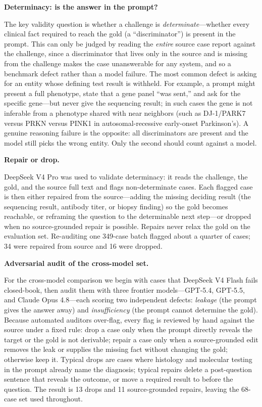 \documentclass{article}
\renewcommand{\paragraph}[1]{%
  \par\addvspace{0.42\baselineskip}%
  \noindent\textbf{#1}\par\nobreak\vspace{-0.28\baselineskip}%
}
\begin{document}
\paragraph{Determinacy: is the answer in the prompt?} The key validity question is whether a challenge is
\emph{determinate}---whether every clinical fact required to reach the gold (a ``discriminator'') is present
in the prompt. This can only be judged by reading the \emph{entire} source case report against the
challenge, since a discriminator that lives only in the source and is missing from the challenge makes the
case unanswerable for any system, and so a benchmark defect rather than a model failure. The most common
defect is asking for an entity whose defining test result is withheld. For example, a prompt might present a
full phenotype, state that a gene panel ``was sent,'' and ask for the specific gene---but never give the
sequencing result; in such cases the gene is not inferable from a phenotype shared with near neighbors (such
as DJ-1/PARK7 versus PRKN versus PINK1 in autosomal-recessive early-onset Parkinson's). A genuine reasoning
failure is the opposite: all discriminators are present and the model still picks the wrong entity. Only the
second should count against a model.

\paragraph{Repair or drop.} DeepSeek V4 Pro was used to validate determinacy: it reads the challenge, the
gold, and the source full text and flags non-determinate cases. Each flagged case is then either repaired
from the source---adding the missing deciding result (the sequencing result, antibody titer, or biopsy
finding) so the gold becomes
reachable, or reframing the question to the determinable next step---or dropped when no source-grounded
repair is possible. Repairs never relax the gold on the evaluation set. Re-auditing one 349-case batch
flagged about a quarter of cases; 34 were repaired from source and 16 were dropped.

\paragraph{Adversarial audit of the cross-model set.} For the cross-model comparison we begin with cases
that DeepSeek V4 Flash fails closed-book, then audit them with three frontier models---GPT-5.4, GPT-5.5, and
Claude Opus 4.8---each scoring two independent defects: \emph{leakage} (the prompt gives the answer away) and
\emph{insufficiency} (the prompt cannot determine the gold). Because automated auditors over-flag, every
flag is reviewed by hand against the source under a fixed rule: drop a case only when the prompt directly
reveals the target or the gold is not derivable; repair a case only when a source-grounded edit removes the
leak or supplies the missing fact without changing the gold; otherwise keep it. Typical drops are cases
where histology and molecular testing in the prompt already name the diagnosis; typical repairs delete a
post-question sentence that reveals the outcome, or move a required result to before the question. The
result is 13 drops and 11 source-grounded repairs, leaving the 68-case set used throughout.
\end{document}
